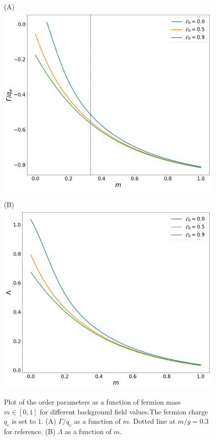 \begin{figure}[h]
	\begin{minipage}{.5\textwidth}
		\centering(A)
		\includegraphics[scale=0.18]{figures/ChiralCond-mm.png}
	\end{minipage}%
	\begin{minipage}{0.5\textwidth}
		\centering(B)
		\includegraphics[scale=0.18]{figures/AxialDensity-mm.png}
	\end{minipage}
	\caption{Plot of the order parameters as a function of fermion mass $m\in[0,1]$ for different background field values.The fermion charge $q_e$ is set to $1$. (A) $\Gamma/q_e$ as a function of $m$. Dotted line at $m/g=0.3$ for reference. (B) $\Lambda$ as a function of $m$.}\label{fig:axialchiralmass}
\end{figure}

